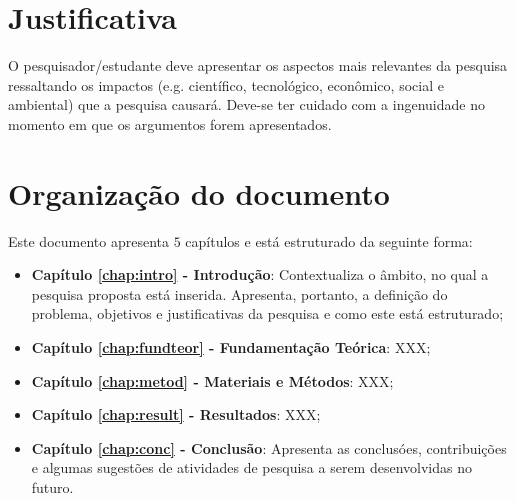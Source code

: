 \section{Justificativa}
\label{sec:justi}

O pesquisador/estudante deve apresentar os aspectos mais
relevantes da pesquisa ressaltando os impactos (e.g. cient\'ifico,
tecnol\'ogico, econ\^omico, social e ambiental) que a pesquisa
causar\'a. Deve-se ter cuidado com a ingenuidade no momento em que
os argumentos forem apresentados.




\section{Organização do documento}
\label{section:organizacao}

Este documento apresenta $5$ capítulos e está estruturado da seguinte forma:

\begin{itemize}

  \item \textbf{Capítulo \ref{chap:intro} - Introdução}: Contextualiza o âmbito, no qual a pesquisa proposta está inserida. Apresenta, portanto, a definição do problema, objetivos e justificativas da pesquisa e como este \thetypeworkthree está estruturado;
  \item \textbf{Capítulo \ref{chap:fundteor} - Fundamentação Teórica}: XXX;
  \item \textbf{Capítulo \ref{chap:metod} - Materiais e Métodos}: XXX;
  \item \textbf{Capítulo \ref{chap:result} - Resultados}: XXX;
  \item \textbf{Capítulo \ref{chap:conc} - Conclusão}: Apresenta as conclusóes, contribuições e algumas sugestões de atividades de pesquisa a serem desenvolvidas no futuro.

\end{itemize}
